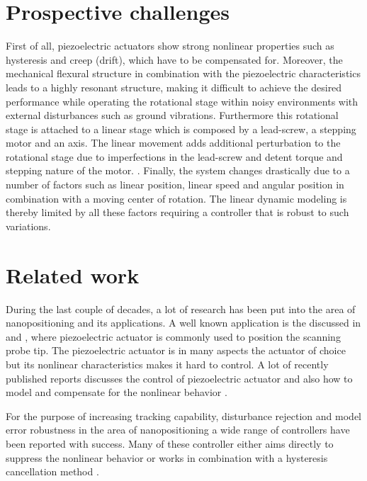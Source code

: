 \section{Prospective challenges}\label{sec:prospectiveChallanges}
First of all, piezoelectric actuators show strong nonlinear properties such as hysteresis and creep (drift), which have to be compensated for.\citep{Piezo:2008} Moreover, the mechanical flexural structure in combination with the piezoelectric characteristics leads to a highly resonant structure, making it difficult to achieve the desired performance while operating the rotational stage within noisy environments with external disturbances such as ground vibrations. Furthermore this rotational stage is attached to a linear stage which is composed by a lead-screw, a stepping motor and an axis. The linear movement adds additional perturbation to the rotational stage due to imperfections in the lead-screw and detent torque and stepping nature of the motor. \citep{ButcherController:2015}. Finally, the system changes drastically due to a number of factors such as linear position, linear speed and angular position in combination with a moving center of rotation. The linear dynamic modeling is thereby limited by all these factors requiring a controller that is robust to such variations.

\section{Related work}
During the last couple of decades, a lot of research has been put into the area of nanopositioning and its applications. A well known application is the \abbrAFM discussed in \citep{SurveyOfControlIssues:2007} and \citep{chuang2013robust}, where piezoelectric actuator is commonly used to position the scanning probe tip. The piezoelectric actuator is in many aspects the actuator of choice but its nonlinear characteristics makes it hard to control. A lot of recently published reports discusses the control of piezoelectric actuator \citep{gu2016modeling} \citep{gu2013motion} and also how to model and compensate for the nonlinear behavior \citep{Maxwell:2012}  \citep{leang2002hysteresis} \citep{ButcherIdentification:2015} \citep{Biggio:2014}.

For the purpose of increasing tracking capability, disturbance rejection and model error robustness in the area of nanopositioning a wide range of controllers have been reported with success. Many of these controller either aims directly to suppress the nonlinear behavior \citep{ompc} \citep{xu2014model} \citep{Elmali:1996} or works in combination with a hysteresis cancellation method \citep{gu:2014} \citep{inputshaper}.

